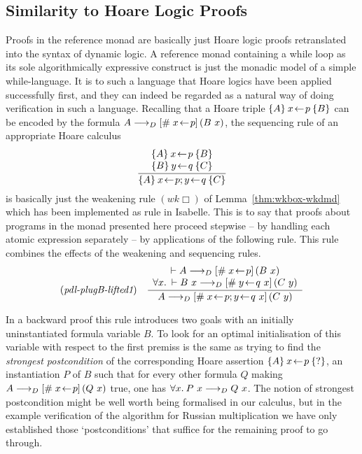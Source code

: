 \subsection{Similarity to Hoare Logic Proofs}
Proofs in the reference monad are basically just Hoare logic proofs retranslated
into the syntax of dynamic logic.  A reference monad containing a while loop as
its sole algorithmically expressive construct is just the monadic model of a
simple while-language. It is to such a language that Hoare logics have been
applied successfully first, and they can indeed be regarded as a natural way of
doing verification in such a language. Recalling that a Hoare triple
$\{A\}\:x\!\gets\! p\:\{B\}$ can be encoded by the formula $A \longrightarrow_D
[\#\;x\!\gets\! p]\,{(B\ x)}$, the sequencing rule of an appropriate Hoare
calculus
\[
\Rule{\begin{array}{cc}
         \PHTriple{A}{x\leteq p}{B}\\
         \PHTriple{B}{y\leteq q}{C}
       \end{array} }
     {\PHTriple{A}{x\leteq p; y\leteq q}{C}}
\]
is basically just the weakening rule $(wk\Box)$ of Lemma~\ref{thm:wkbox-wkdmd}
which has been implemented as rule  in Isabelle.  This is to say
that proofs about programs in the monad presented here proceed stepwise -- \IE
by handling each atomic expression separately -- by applications of the
following rule. This rule combines the effects of the weakening and sequencing
rules. 
\[
\NRule{\mbox{\itshape  pdl-plugB-lifted1}}{\begin{array}{cc}
        \vdash {A \longrightarrow_D \PDLSBox{x\leteq p}{(B\ x)}}\\
        \forall x\bdot \vdash {B\ x \longrightarrow_D \PDLSBox{y\leteq q\ x}{(C\ y)}}
      \end{array}}
      {A \longrightarrow_D \PDLSBox{x\leteq p; y\leteq q\ x}{(C\ y)}}
\]

In a backward proof this rule introduces two goals with an initially
uninstantiated formula variable $B$. To look for an optimal initialisation of
this variable with respect to the first premiss is the same as trying to find
the \emph{strongest postcondition} of the corresponding Hoare assertion
$\{A\}\:x\!\gets\! p\:\{?\}$, \IE an instantiation $P$ of $B$ such that for
every other formula $Q$ making $A \longrightarrow_D [\#\;x\!\gets\! p]\,{(Q\ x)}$ true, one has
$ \forall x.\: P\ x \longrightarrow_D Q\ x $. The notion of strongest postcondition might be well
worth being formalised in our calculus, but in the example verification of the
algorithm for Russian multiplication we have only established those
`postconditions' that suffice for the remaining proof to go through.




